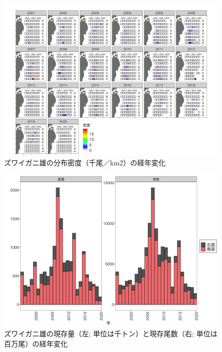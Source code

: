 \documentclass[11pt]{article} %
\begin{document}
\begin{linenumbers}
\begin{figure}[h]
  \centering
  \includegraphics[width = 14cm]{ズワイガニ雄dens.png}
  \caption{ズワイガニ雄の分布密度（千尾／km2）の経年変化}
\end{figure}

\begin{figure}[h]
  \centering
  \includegraphics[width = 14cm]{ズワイガニ雄trend.png}
  \caption{ズワイガニ雄の現存量（左; 単位は千トン）と現存尾数（右; 単位は百万尾）の経年変化}
\end{figure}


\end{linenumbers}
\end{document}
